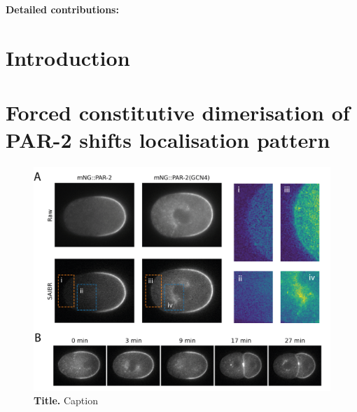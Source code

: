 \documentclass[12pt]{"report"}
\newcommand{\mycaption}[2]{\caption[#1]{\textbf{#1.} #2}}
\begin{document}
\textbf{Detailed contributions:}\\

\clearpage
\section{Introduction}

\section{Forced constitutive dimerisation of PAR-2 shifts localisation pattern}



\begin{figure}[!h]
\includegraphics[scale=1]{gcn4}
\setlength{\abovecaptionskip}{20pt}
\centering
\mycaption{Title}{Caption}
\label{fig:gcn4}
\end{figure}
\end{document}
